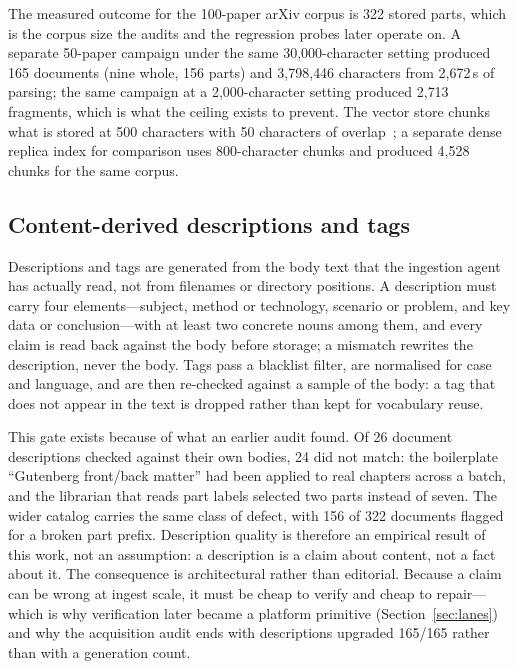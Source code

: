 The measured outcome for the 100-paper arXiv corpus is 322 stored
parts, which is the corpus size the audits and the regression probes
later operate on. A separate 50-paper campaign under the same
30{,}000-character setting produced 165 documents (nine whole, 156
parts) and 3{,}798{,}446 characters from 2{,}672\,s of parsing; the
same campaign at a 2{,}000-character setting produced 2{,}713
fragments, which is what the ceiling exists to prevent. The vector
store chunks what is stored at 500 characters with 50 characters of
overlap~\citep{chroma,hnsw}; a separate dense replica index for
comparison uses 800-character chunks and produced 4{,}528 chunks for
the same corpus.

\subsection{Content-derived descriptions and tags}

Descriptions and tags are generated from the body text that the
ingestion agent has actually read, not from filenames or directory
positions. A description must carry four elements---subject,
method or technology, scenario or problem, and key data or
conclusion---with at least two concrete nouns among them, and every
claim is read back against the body before storage; a mismatch rewrites
the description, never the body. Tags pass a blacklist filter, are
normalised for case and language, and are then re-checked against a
sample of the body: a tag that does not appear in the text is dropped
rather than kept for vocabulary reuse.

This gate exists because of what an earlier audit found. Of 26 document
descriptions checked against their own bodies, 24 did not match: the
boilerplate ``Gutenberg front/back matter'' had been applied to real
chapters across a batch, and the librarian that reads part labels
selected two parts instead of seven. The wider catalog carries the same
class of defect, with 156 of 322 documents flagged for a broken part
prefix. Description quality is therefore an empirical result of this
work, not an assumption: a description is a claim about content, not a
fact about it. The consequence is architectural rather than editorial.
Because a claim can be wrong at ingest scale, it must be cheap to
verify and cheap to repair---which is why verification later became a
platform primitive (Section~\ref{sec:lanes}) and why the acquisition
audit ends with descriptions upgraded 165/165 rather than with a
generation count.

